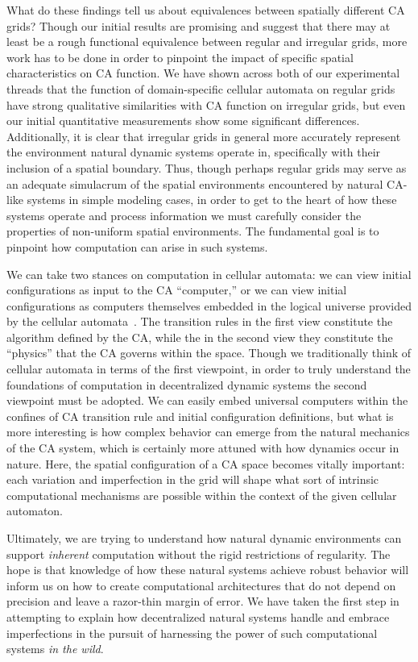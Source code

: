 \documentclass[a4paper,11pt]{article}
\begin{document}
What do these findings tell us about equivalences between spatially different CA grids? Though our initial results are promising and suggest that there may at least be a rough functional equivalence between regular and irregular grids, more work has to be done in order to pinpoint the impact of specific spatial characteristics on CA function. We have shown across both of our experimental threads that the function of domain-specific cellular automata on regular grids have strong qualitative similarities with CA function on irregular grids, but even our initial quantitative measurements show some significant differences. Additionally, it is clear that irregular grids in general more accurately represent the environment natural dynamic systems operate in, specifically with their inclusion of a spatial boundary. Thus, though perhaps regular grids may serve as an adequate simulacrum of the spatial environments encountered by natural CA-like systems in simple modeling cases, in order to get to the heart of how these systems operate and process information we must carefully consider the properties of non-uniform spatial environments. The fundamental goal is to pinpoint how computation can arise in such systems.

We can take two stances on computation in cellular automata: we can view initial configurations as input to the CA ``computer,'' or we can view initial configurations as computers themselves embedded in the logical universe provided by the cellular automata~\cite{la90}. The transition rules in the first view constitute the algorithm defined by the CA, while the in the second view they constitute the ``physics'' that the CA governs within the space. Though we traditionally think of cellular automata in terms of the first viewpoint, in order to truly understand the foundations of computation in decentralized dynamic systems the second viewpoint must be adopted. We can easily embed universal computers within the confines of CA transition rule and initial configuration definitions, but what is more interesting is how complex behavior can emerge from the natural mechanics of the CA system, which is certainly more attuned with how dynamics occur in nature. Here, the spatial configuration of a CA space becomes vitally important: each variation and imperfection in the grid will shape what sort of intrinsic computational mechanisms are possible within the context of the given cellular automaton.

Ultimately, we are trying to understand how natural dynamic environments can support \textit{inherent} computation without the rigid restrictions of regularity. The hope is that knowledge of how these natural systems achieve robust behavior will inform us on how to create computational architectures that do not depend on precision and leave a razor-thin margin of error. We have taken the first step in attempting to explain how  decentralized natural systems handle and embrace imperfections in the pursuit of harnessing the power of such computational systems \textit{in the wild}.
\end{document}
